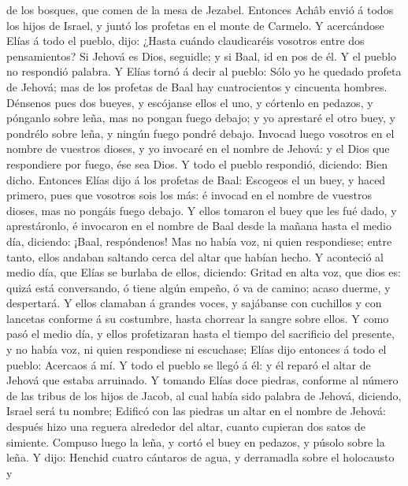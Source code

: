 de los bosques, que comen de la mesa de Jezabel.  Entonces
Achâb envió á todos los hijos de Israel, y juntó los profetas en el
monte de Carmelo.  Y acercándose Elías á todo el pueblo,
dijo: ¿Hasta cuándo claudicaréis vosotros entre dos pensamientos? Si
Jehová es Dios, seguidle; y si Baal, id en pos de él. Y el pueblo no
respondió palabra.  Y Elías tornó á decir al pueblo: Sólo
yo he quedado profeta de Jehová; mas de los profetas de Baal hay
cuatrocientos y cincuenta hombres.  Dénsenos pues dos
bueyes, y escójanse ellos el uno, y córtenlo en pedazos, y pónganlo
sobre leña, mas no pongan fuego debajo; y yo aprestaré el otro buey, y
pondrélo sobre leña, y ningún fuego pondré debajo.  Invocad
luego vosotros en el nombre de vuestros dioses, y yo invocaré en el
nombre de Jehová: y el Dios que respondiere por fuego, ése sea Dios. Y
todo el pueblo respondió, diciendo: Bien dicho.  Entonces
Elías dijo á los profetas de Baal: Escogeos el un buey, y haced primero,
pues que vosotros sois los más: é invocad en el nombre de vuestros
dioses, mas no pongáis fuego debajo.  Y ellos tomaron el
buey que les fué dado, y aprestáronlo, é invocaron en el nombre de Baal
desde la mañana hasta el medio día, diciendo: ¡Baal, respóndenos! Mas no
había voz, ni quien respondiese; entre tanto, ellos andaban saltando
cerca del altar que habían hecho.  Y aconteció al medio
día, que Elías se burlaba de ellos, diciendo: Gritad en alta voz, que
dios es: quizá está conversando, ó tiene algún empeño, ó va de camino;
acaso duerme, y despertará.  Y ellos clamaban á grandes
voces, y sajábanse con cuchillos y con lancetas conforme á su costumbre,
hasta chorrear la sangre sobre ellos.  Y como pasó el medio
día, y ellos profetizaran hasta el tiempo del sacrificio del presente, y
no había voz, ni quien respondiese ni escuchase;  Elías
dijo entonces á todo el pueblo: Acercaos á mí. Y todo el pueblo se llegó
á él: y él reparó el altar de Jehová que estaba arruinado. 
Y tomando Elías doce piedras, conforme al número de las tribus de los
hijos de Jacob, al cual había sido palabra de Jehová, diciendo, Israel
será tu nombre;  Edificó con las piedras un altar en el
nombre de Jehová: después hizo una reguera alrededor del altar, cuanto
cupieran dos satos de simiente.  Compuso luego la leña, y
cortó el buey en pedazos, y púsolo sobre la leña.  Y dijo:
Henchid cuatro cántaros de agua, y derramadla sobre el holocausto y
